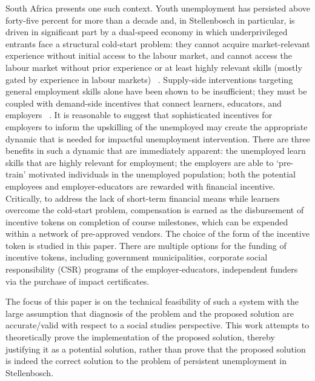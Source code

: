 \documentclass[conference]{IEEEtran}
\begin{document}
South Africa presents one such context. Youth unemployment has persisted above forty-five percent for more than a decade and, in Stellenbosch in particular, is driven in significant part by a dual-speed economy in which underprivileged entrants face a structural cold-start problem: they cannot acquire market-relevant experience without initial access to the labour market, and cannot access the labour market without prior experience or at least highly relevant skills (mostly gated by experience in labour markets) ~\cite{bhorat2016youth,graham2015youth}.
Supply-side interventions targeting general employment skills alone have been shown to be insufficient; they must be coupled with demand-side incentives that connect learners, educators, and employers ~\cite{mckenzie2017almp,bhorat2016youth}. It is reasonable to suggest that sophisticated incentives for employers to inform the upskilling of the unemployed may create the appropriate dynamic that is needed for impactful unemployment intervention. There are three benefits in such a dynamic that are immediately apparent: the unemployed learn skills that are highly relevant for employment; the employers are able to `pre-train' motivated individuals in the unemployed population; both the potential employees and employer-educators are rewarded with financial incentive. Critically, to address the lack of short-term financial means while learners overcome the cold-start problem, compensation is earned as the disbursement of incentive tokens on completion of course milestones, which can be expended within a network of pre-approved vendors. The choice of the form of the incentive token is studied in this paper. There are multiple options for the funding of incentive tokens, including government municipalities,  corporate social responsibility (CSR) programs of the employer-educators, independent funders via the purchase of impact certificates.

The focus of this paper is on the technical feasibility of such a system with the large assumption that diagnosis of the problem and the proposed solution are accurate/valid with respect to a social studies perspective. This work attempts to theoretically prove the implementation of the proposed solution, thereby justifying it as a potential solution, rather than prove that the proposed solution is indeed the correct solution to the problem of persistent unemployment in Stellenbosch.
\end{document}
